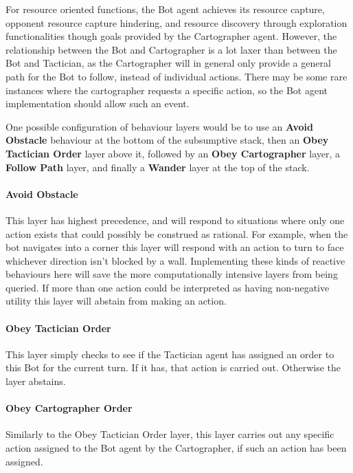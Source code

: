 \documentclass[a4paper,10pt]{article}
\begin{document}
For resource oriented functions, the Bot agent achieves its resource capture, opponent resource capture hindering, and resource discovery through exploration functionalities though goals provided by the Cartographer agent. However, the relationship between the Bot and Cartographer is a lot laxer than between the Bot and Tactician, as the Cartographer will in general only provide a general path for the Bot to follow, instead of individual actions. There may be some rare instances where the cartographer requests a specific action, so the Bot agent implementation should allow such an event.

One possible configuration of behaviour layers would be to use an \textbf{Avoid Obstacle} behaviour at the bottom of the subsumptive stack, then an \textbf{Obey Tactician Order} layer above it, followed by an \textbf{Obey Cartographer} layer, a \textbf{Follow Path} layer, and finally a \textbf{Wander} layer at the top of the stack.

\vspace{-3mm}
\paragraph{Avoid Obstacle} This layer has highest precedence, and will respond to situations where only one action exists that could possibly be construed as rational. For example, when the bot navigates into a corner this layer will respond with an action to turn to face whichever direction isn't blocked by a wall. Implementing these kinds of reactive behaviours here will save the more computationally intensive layers from being queried. If more than one action could be interpreted as having non-negative utility this layer will abstain from making an action.

\vspace{-3mm}
\paragraph{Obey Tactician Order} This layer simply checks to see if the Tactician agent has assigned an order to this Bot for the current turn. If it has, that action is carried out. Otherwise the layer abstains.

\vspace{-3mm}
\paragraph{Obey Cartographer Order} Similarly to the Obey Tactician Order layer, this layer carries out any specific action assigned to the Bot agent by the Cartographer, if such an action has been assigned.
\end{document}
